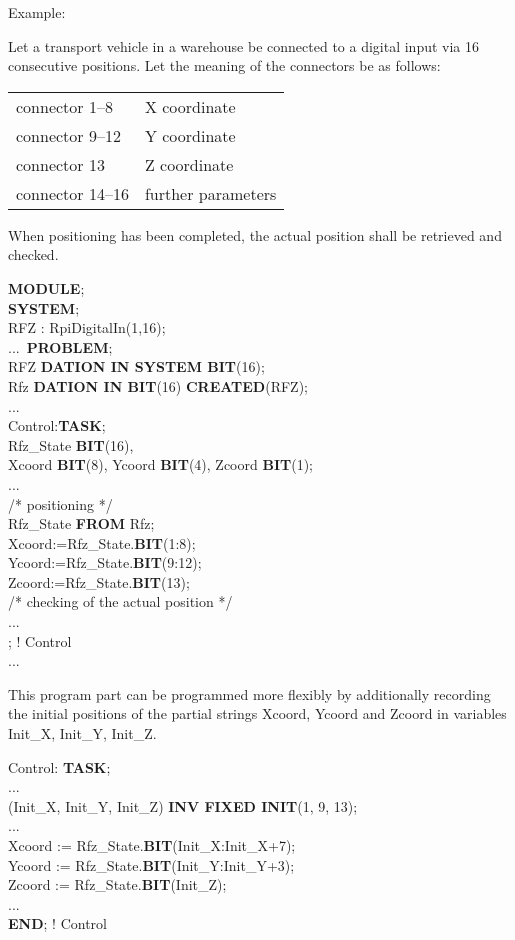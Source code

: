 Example:

Let a transport vehicle in a warehouse be connected to a digital input
via 16 consecutive positions. Let the meaning of the connectors be as
follows:

\begin{tabular}{l@{ : }l}
connector 1--8   & X coordinate\\
connector 9--12  & Y coordinate\\
connector 13     & Z coordinate\\
connector 14--16 & further parameters
\end{tabular}

When positioning has been completed, the actual position shall be
retrieved and checked.

{\bf MODULE};\\
{\bf SYSTEM};\\
\x RFZ : RpiDigitalIn(1,16);\\
\x ...\
{\bf PROBLEM};\\
 RFZ {\bf DATION IN SYSTEM BIT}(16);\\
 Rfz {\bf DATION IN BIT}(16) {\bf CREATED}(RFZ);\\
\x ...\\
\x Control:{\bf TASK};\\
\x {} Rfz\_State {\bf BIT}(16),\\
\x \x \x Xcoord {\bf BIT}(8), Ycoord {\bf BIT}(4), Zcoord {\bf BIT}(1);\\
\x \x ...\\
\x \x \x /* positioning */ \\
\x {} Rfz\_State {\bf FROM} Rfz;\\
\x \x Xcoord:=Rfz\_State.{\bf BIT}(1:8);\\
\x \x Ycoord:=Rfz\_State.{\bf BIT}(9:12);\\
\x \x Zcoord:=Rfz\_State.{\bf BIT}(13);\\
\x \x \x /* checking of the actual position */ \\
\x \x ...\\
; ! Control\\
\x ...


This program part can be programmed more flexibly by additionally
recording the initial positions of the partial strings Xcoord, Ycoord
and Zcoord in variables Init\_X, Init\_Y, Init\_Z.

Control: {\bf TASK};\\
\x ... \\
 (Init\_X, Init\_Y, Init\_Z) {\bf INV FIXED INIT}(1, 9, 13);\\
\x ... \\
\x Xcoord := Rfz\_State.{\bf BIT}(Init\_X:Init\_X+7);\\
\x Ycoord := Rfz\_State.{\bf BIT}(Init\_Y:Init\_Y+3);\\
\x Zcoord := Rfz\_State.{\bf BIT}(Init\_Z);\\
\x ... \\
{\bf END}; ! Control

